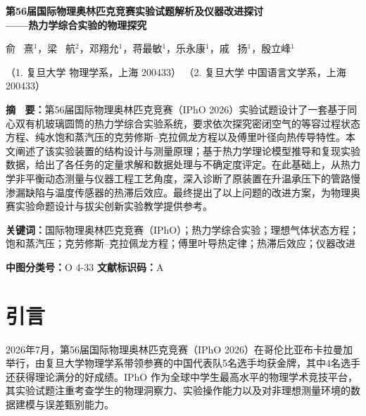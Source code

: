 \documentclass[10pt, a4paper]{ctexart}
\begin{document}
\let\thefootnote\relax{}

\begin{center}
{\Large \bfseries 第56届国际物理奥林匹克竞赛实验试题解析及仪器改进探讨\\——热力学综合实验的物理探究}

\vspace{0.4cm}
{\large 俞 \ 熹$^{1}$，梁 \ 航$^{2}$，邓翔允$^{1}$，蒋最敏$^{1}$，乐永康$^{1}$，戚 \ 扬$^{1}$，殷立峰$^{1}$}

\vspace{0.2cm}
{\small （1. 复旦大学 物理学系，上海 200433）}
{\small （2. 复旦大学 中国语言文学系，上海 200433）}
\end{center}

\vspace{0.2cm}
\noindent \textbf{摘 \ 要：}第56届国际物理奥林匹克竞赛（IPhO 2026）实验试题设计了一套基于同心双有机玻璃圆筒的热力学综合实验系统，要求依次探究密闭空气的等容过程状态方程、纯水饱和蒸汽压的克劳修斯--克拉佩龙方程以及傅里叶径向热传导特性。本文阐述了该实验装置的结构设计与测量原理；基于热力学理论模型推导和复现实验数据，给出了各任务的定量求解和数据处理与不确定度评定。在此基础上，从热力学非平衡动态测量与仪器工程工艺角度，深入诊断了原装置在升温承压下的管路慢渗漏缺陷与温度传感器的热滞后效应。最终提出了以上问题的改进方案，为物理奥赛实验命题设计与拔尖创新实验教学提供参考。

\noindent \textbf{关键词：}国际物理奥林匹克竞赛（IPhO）；热力学综合实验；理想气体状态方程；饱和蒸汽压；克劳修斯--克拉佩龙方程；傅里叶导热定律；热滞后效应；仪器改进

\noindent \textbf{中图分类号：}O 4-33 \hfill \textbf{文献标识码：}A


\section{引言}
2026年7月，第56届国际物理奥林匹克竞赛（IPhO 2026）在哥伦比亚布卡拉曼加举行\cite{ref16}，由复旦大学物理学系带领参赛的中国代表队5名选手均获金牌，其中4名选手还获得理论满分的好成绩。IPhO 作为全球中学生最高水平的物理学术竞技平台，其实验试题注重考查学生的物理洞察力、实验操作能力以及对非理想测量环境的数据建模与误差甄别能力\cite{ref1, ref2, ref3, ref4}。
\end{document}
